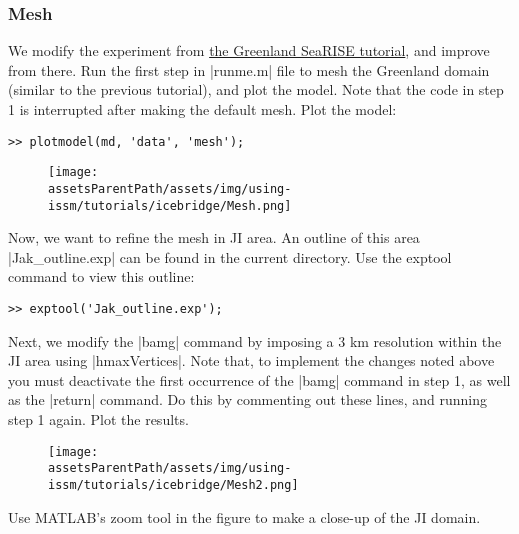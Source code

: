 \subsubsection{Mesh} %
We modify the experiment from 
\hyperref[sec:using-issm-tutorials-greenland]{the Greenland SeaRISE tutorial},
and improve from there. Run the first step in \lstinlinebg|runme.m| file to mesh the Greenland domain (similar to the previous tutorial), and plot the model. Note that the code in step 1 is interrupted after making the default mesh. Plot the model:
\begin{lstlisting}
>> plotmodel(md, 'data', 'mesh');
\end{lstlisting}
\begin{figure}[H]
	\begin{center}
		\texttt{[image: \\assetsParentPath/assets/img/using-issm/tutorials/icebridge/Mesh.png]}
	\end{center}
\end{figure}
Now, we want to refine the mesh in JI area. An outline of this area \lstinlinebg|Jak_outline.exp| can be found in the current directory. Use the exptool command to view this outline:
\begin{lstlisting}
>> exptool('Jak_outline.exp');
\end{lstlisting}

Next, we modify the \lstinlinebg|bamg| command by imposing a 3 km resolution within the JI area using \lstinlinebg|hmaxVertices|. Note that, to implement the changes noted above you must deactivate the first occurrence of the \lstinlinebg|bamg| command in step 1, as well as the \lstinlinebg|return| command. Do this by commenting out these lines, and running step 1 again. Plot the results.
\begin{figure}[H]
	\begin{center}
		\texttt{[image: \\assetsParentPath/assets/img/using-issm/tutorials/icebridge/Mesh2.png]}
	\end{center}
\end{figure}
Use MATLAB's zoom tool in the figure to make a close-up of the JI domain.
